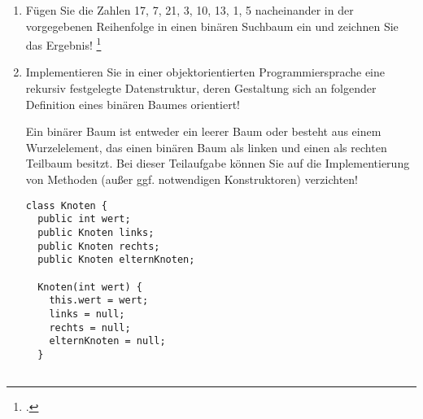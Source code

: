 \documentclass{bschlangaul-aufgabe}
\begin{document}

\begin{enumerate}


\item Fügen Sie die Zahlen 17, 7, 21, 3, 10, 13, 1, 5 nacheinander in
der vorgegebenen Reihenfolge in einen binären Suchbaum ein und zeichnen
Sie das Ergebnis!
\footcite{examen:46115:2014:03}

\begin{bAntwort}
\begin{center}
\end{center}
\end{bAntwort}


\item Implementieren Sie in einer objektorientierten Programmiersprache
eine rekursiv festgelegte Datenstruktur, deren Gestaltung sich an
folgender Definition eines binären Baumes orientiert!

Ein binärer Baum ist entweder ein leerer Baum oder besteht aus einem
Wurzelelement, das einen binären Baum als linken und einen als rechten
Teilbaum besitzt. Bei dieser Teilaufgabe können Sie auf die
Implementierung von Methoden (außer ggf. notwendigen Konstruktoren)
verzichten!

\begin{bAntwort}

\begin{verbatim}
class Knoten {
  public int wert;
  public Knoten links;
  public Knoten rechts;
  public Knoten elternKnoten;

  Knoten(int wert) {
    this.wert = wert;
    links = null;
    rechts = null;
    elternKnoten = null;
  }


\end{verbatim}
\end{bAntwort}
\end{enumerate}
\end{document}
